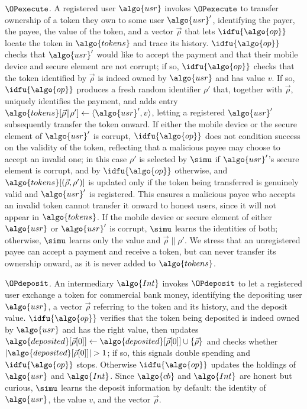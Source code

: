 \underline{$\OPexecute$}. A registered user $\algo{usr}$ invokes $\OPexecute$
to transfer ownership of a token they own to some user $\algo{usr}'$,
identifying the payer, the payee, the value of the token, and a vector
$\vec{\rho}$ that lets $\idfu{\algo{op}}$ locate the token in $\algo{tokens}$ and trace
its history. $\idfu{\algo{op}}$ checks that $\algo{usr}'$ would like to accept the
payment and that their mobile device and secure element are not corrupt; if so,
$\idfu{\algo{op}}$ checks that the token identified by $\vec{\rho}$ is indeed owned by
$\algo{usr}$ and has value $v$. If so, $\idfu{\algo{op}}$ produces a fresh random
identifier $\rho'$ that, together with $\vec{\rho}$, uniquely identifies the
payment, and adds entry $\algo{tokens}[\vec{\rho} \| \rho'] \gets \langle
\algo{usr}', v \rangle$, letting a registered $\algo{usr}'$ subsequently
transfer the token onward. If either the mobile device or the secure element of
$\algo{usr}'$ is corrupt, $\idfu{\algo{op}}$ does not condition success on the validity
of the token, reflecting that a malicious payee may choose to accept an invalid
one; in this case $\rho'$ is selected by $\simu$ if $\algo{usr}'$'s secure
element is corrupt, and by $\idfu{\algo{op}}$ otherwise, and $\algo{tokens}[(\vec{\rho},
\rho')]$ is updated only if the token being transferred is genuinely valid and
$\algo{usr}'$ is registered. This ensures a malicious payee who accepts an
invalid token cannot transfer it onward to honest users, since it will not
appear in $\algo{tokens}$. If the mobile device or secure element of either
$\algo{usr}$ or $\algo{usr}'$ is corrupt, $\simu$ learns the identities of
both; otherwise, $\simu$ learns only the value and $\vec{\rho} \| \rho'$. We
stress that an unregistered payee can accept a payment and receive a token, but
can never transfer its ownership onward, as it is never added to
$\algo{tokens}$.

\underline{$\OPdeposit$}. An intermediary $\algo{Int}$ invokes
$\OPdeposit$ to let a registered user exchange a token for commercial bank
money, identifying the depositing user $\algo{usr}$, a vector $\vec{\rho}$
referring to the token and its history, and the deposit value. $\idfu{\algo{op}}$
verifies that the token being deposited is indeed owned by $\algo{usr}$ and has
the right value, then updates $\algo{deposited}[\vec{\rho}[0]] \gets
\algo{deposited}[\vec{\rho}[0]] \cup \{\vec{\rho}\}$ and checks whether
$|\algo{deposited}[\vec{\rho}[0]]| > 1$; if so, this signals double spending
and $\idfu{\algo{op}}$ stops. Otherwise $\idfu{\algo{op}}$ updates the holdings of $\algo{usr}$
and $\algo{Int}$. Since $\algo{cb}$ and $\algo{Int}$ are honest but curious,
$\simu$ learns the deposit information by default: the identity of
$\algo{usr}$, the value $v$, and the vector $\vec{\rho}$.

